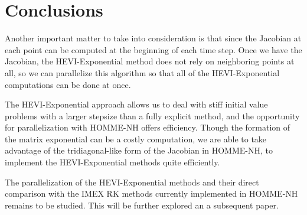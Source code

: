 \documentclass{csri19}
\begin{document}
\section{Conclusions}
Another important matter to take into consideration is that since the 
Jacobian at each point can be computed at the beginning of each time step.
Once we have the Jacobian, the HEVI-Exponential method does not rely 
on neighboring points at all, so we can parallelize this algorithm so that
all of the HEVI-Exponential computations can be done at once.

The HEVI-Exponential approach allows us to deal with stiff initial value
problems with a larger stepsize than a fully explicit method, and the 
opportunity for parallelization with HOMME-NH offers efficiency. Though 
the formation of the matrix exponential can be a costly computation, we 
are able to take advantage of the tridiagonal-like form of the Jacobian in 
HOMME-NH, to implement the HEVI-Exponential methods quite efficiently.

The parallelization of the HEVI-Exponential methods and their direct 
comparison with the IMEX RK methods currently implemented in HOMME-NH 
remains to be studied. This will be further explored an a subsequent paper.




%
\end{document}

